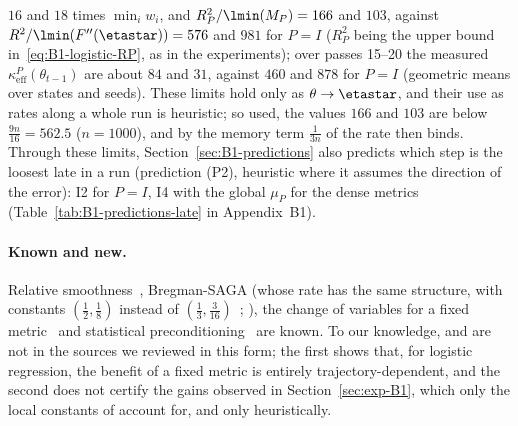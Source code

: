 $16$ and $18$ times $\min_iw_i$, and $R_P^2/\lmin(M_P)=166$ and $103$, against $R^2/\lmin(F''(\etastar))=576$ and $981$
for $P=I$ ($R_P^2$ being the upper bound in~\eqref{eq:B1-logistic-RP}, as in the experiments); over passes 15--20 the
measured $\kappa^P_{\mathrm{eff}}(\theta_{t-1})$ are about $84$ and $31$, against $460$ and $878$ for $P=I$ (geometric
means over states and seeds). These limits hold only as $\theta\to\etastar$, and their use as rates along a whole run
is heuristic; so used, the values $166$ and $103$ are below $\frac{9n}{16}=562.5$ ($n=1000$), and by
 the memory term $\frac1{3n}$ of the rate then binds. Through these limits,
Section~\ref{sec:B1-predictions} also predicts which step is the loosest late in a run (prediction (P2), heuristic
where it assumes the direction of the error): I2 for $P=I$, I4 with the global $\mu_P$ for the dense metrics
(Table~\ref{tab:B1-predictions-late} in Appendix~B1).

\paragraph{Known and new.}
Relative smoothness~\cite{lu2018relatively,bauschke2017descent}, Bregman-SAGA (whose rate has the same structure, with
constants $(\frac12,\frac18)$ instead of $(\frac13,\frac3{16})$~\cite[Corollary~1]{dragomir2021fast};
), the change of variables for a fixed metric~\cite{kolte2015accelerating,gonen2016solving}
and statistical preconditioning~\cite{hendrikx2020statistically} are known. To our knowledge,
 and  are not in the sources we reviewed in this form; the first
shows that, for logistic regression, the benefit of a fixed metric is entirely trajectory-dependent, and the second
does not certify the gains observed in Section~\ref{sec:exp-B1}, which only the local constants of
 account for, and only heuristically.

